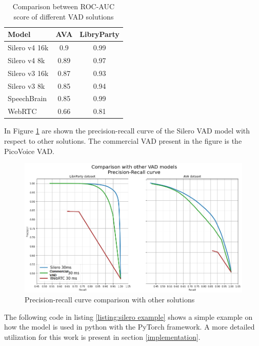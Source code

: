 \documentclass[../main.tex]{subfiles}
\begin{document}
\begin{table}[ht]
    \centering
    \begin{tabular}{|l|c|c|} \hline 
         Model&  AVA& LibryParty\\ \hline 
         Silero v4 16k&  0.9& 0.99\\ \hline 
         Silero v4 8k&  0.89& 0.97\\ \hline 
         Silero v3 16k&  0.87& 0.93\\ \hline 
         Silero v3 8k&  0.85& 0.94\\ \hline 
         SpeechBrain&  0.85& 0.99\\ \hline 
         WebRTC&  0.66& 0.81\\ \hline
    \end{tabular}
    \caption{Comparison between ROC-AUC score of different VAD solutions \cite{SileroVAD}}
    \label{tab:silero-comparison}
\end{table}

\newpage

In Figure \ref{fig:precision-recall curve} are shown the precision-recall curve of the Silero VAD model with respect to other solutions. The commercial VAD present in the figure is the PicoVoice VAD.

\begin{figure}[ht]
    \centering
    \includegraphics[width=\textwidth]{images/silero-comparison.png}
    \caption{Precision-recall curve comparison with other solutions \cite{SileroVAD}}
    \label{fig:precision-recall curve}
\end{figure}

The following code in listing \ref{listing:silero example} shows a simple example on how the model is used in python with the PyTorch framework. A more detailed utilization for this work is present in section \ref{implementation}.
\end{document}
